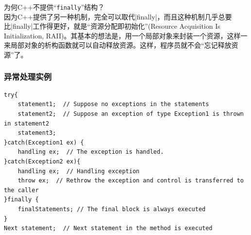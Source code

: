 \vspace{-0.5em}
\begin{shaded}
{\kaishu 为何C++不提供“\verb|finally|”结构？}\\
因为C++提供了另一种机制，完全可以取代\sverb|finally|，而且这种机制几乎总要比\sverb|finally|\;工作得更好，就是“资源分配即初始化”(Resource Acquisition Is Initialization, RAII)。其基本的想法是，用一个局部对象来封装一个资源，这样一来局部对象的析构函数就可以自动释放资源。这样，程序员就不会“忘记释放资源”了。
\end{shaded}
\vspace{-1em}

\subsubsection{异常处理实例}
\begin{lstlisting}
try{
    statement1;  // Suppose no exceptions in the statements
    statement2;  // Suppose an exception of type Exception1 is thrown in statement2
    statement3;
}catch(Exception1 ex) {
    handling ex;  // The exception is handled.
}catch(Exception2 ex){
    handling ex;  // Handling exception 
    throw ex;  // Rethrow the exception and control is transferred to the caller
}finally {
    finalStatements; // The final block is always executed
}
Next statement;  // Next statement in the method is executed
\end{lstlisting}

